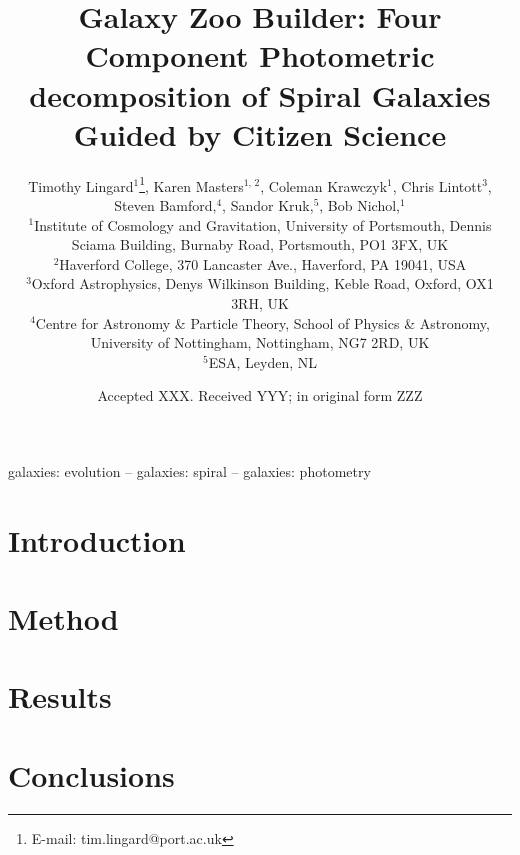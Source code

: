 \documentclass[fleqn,usenatbib]{mnras}
\title[Galaxy Zoo Builder: Method paper]{Galaxy Zoo Builder: Four Component Photometric decomposition of Spiral Galaxies Guided by Citizen Science}
\author[T. Lingard et al.]{
  Timothy Lingard$^{1}$\thanks{E-mail: tim.lingard@port.ac.uk},
  Karen Masters$^{1,\,2}$,
  Coleman Krawczyk$^{1}$,
  Chris Lintott$^{3}$,
  \newauthor
  Steven Bamford,$^{4}$,
  Sandor Kruk,$^{5}$,
  Bob Nichol,$^{1}$
  \\
  $^{1}$Institute of Cosmology and Gravitation, University of Portsmouth, Dennis Sciama Building, Burnaby Road, Portsmouth, PO1 3FX, UK\\
  $^{2}$Haverford College, 370 Lancaster Ave., Haverford, PA 19041, USA\\
  $^{3}$Oxford Astrophysics, Denys Wilkinson Building, Keble Road, Oxford, OX1 3RH, UK\\
  $^{4}$Centre for Astronomy \& Particle Theory, School of Physics \& Astronomy, University of Nottingham, Nottingham, NG7 2RD, UK\\
  $^{5}$ESA, Leyden, NL
}
\date{Accepted XXX. Received YYY; in original form ZZZ}
\begin{document}
\label{firstpage}
\pagerange{\pageref{firstpage}--\pageref{lastpage}}
\maketitle

\begin{abstract}

\end{abstract}

\begin{keywords}
galaxies: evolution -- galaxies: spiral -- galaxies: photometry
\end{keywords}



\section{Introduction}


\section{Method}


\section{Results}


\section{Conclusions}









\appendix





\bsp	%
\label{lastpage}
\end{document}
